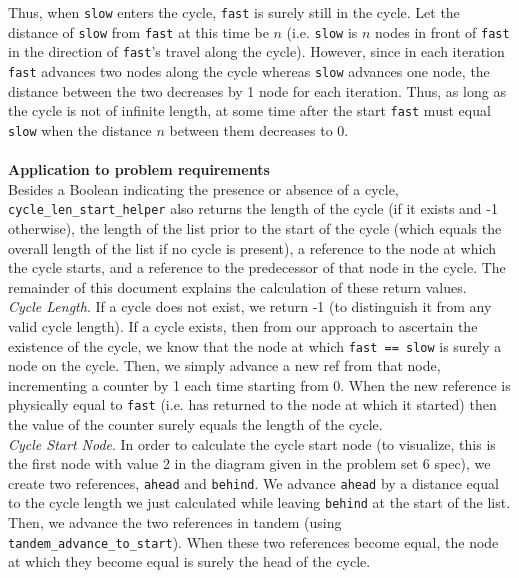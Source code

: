 \documentclass[paper=a4, fontsize=11pt]{scrartcl}
\begin{document}
Thus, when \texttt{slow} enters the cycle, \texttt{fast} is surely still in the cycle. Let the distance of \texttt{slow} from \texttt{fast} at this time be $n$ (i.e.  \texttt{slow} is $n$ nodes in front of \texttt{fast} in the direction of \texttt{fast}'s travel along the cycle). However, since in each iteration \texttt{fast} advances two nodes along the cycle whereas \texttt{slow} advances one node, the distance between the two decreases by 1 node for each iteration. Thus, as long as the cycle is not of infinite length, at some time after the start \texttt{fast} must equal \texttt{slow} when the distance $n$ between them decreases to 0.\\\\

\textbf{Application to problem requirements}\\

Besides a Boolean indicating the presence or absence of a cycle, \texttt{cycle\_len\_start\_helper} also returns the length of the cycle (if it exists and -1 otherwise), the length of the list prior to the start of the cycle (which equals the overall length of the list if no cycle is present), a reference to the node at which the cycle starts, and a reference to the predecessor of that node in the cycle. The remainder of this document explains the calculation of these return values.\\

\textit{Cycle Length}. If a cycle does not exist, we return -1 (to distinguish it from any valid cycle length). If a cycle exists, then from our approach to ascertain the existence of the cycle, we know that the node at which \texttt{fast == slow} is surely a node on the cycle. Then, we simply advance a new ref from that node, incrementing a counter by 1 each time starting from 0. When the new reference is physically equal to \texttt{fast} (i.e. has returned to the node at which it started) then the value of the counter surely equals the length of the cycle.\\

\textit{Cycle Start Node}. In order to calculate the cycle start node (to visualize, this is the first node with value 2 in the diagram given in the problem set 6 spec), we create two references, \texttt{ahead} and \texttt{behind}. We advance \texttt{ahead} by a distance equal to the cycle length we just calculated while leaving \texttt{behind} at the start of the list. Then, we advance the two references in tandem (using \texttt{tandem\_advance\_to\_start}). When these two references become equal, the node at which they become equal is surely the head of the cycle.\\
\end{document}
